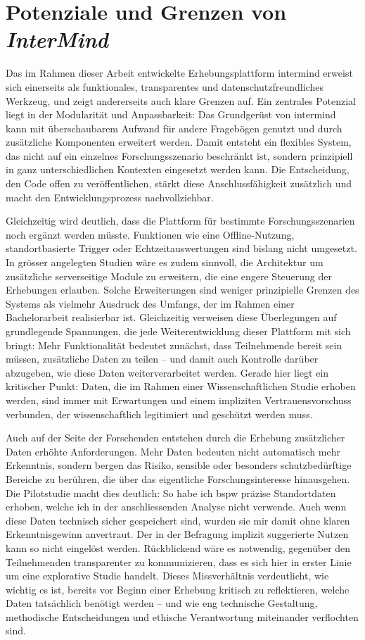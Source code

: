 \section{Potenziale und Grenzen von \textit{InterMind}}

Das im Rahmen dieser Arbeit entwickelte Erhebungsplattform \gls{intermind} erweist sich einerseits als funktionales, transparentes und datenschutzfreundliches Werkzeug, und zeigt andererseits auch klare Grenzen auf. Ein zentrales Potenzial liegt in der Modularität und Anpassbarkeit: Das Grundgerüst von \gls{intermind} kann mit überschaubarem Aufwand für andere Fragebögen genutzt und durch zusätzliche Komponenten erweitert werden. Damit entsteht ein flexibles System, das nicht auf ein einzelnes Forschungsszenario beschränkt ist, sondern prinzipiell in ganz unterschiedlichen Kontexten eingesetzt werden kann. Die Entscheidung, den Code offen zu veröffentlichen, stärkt diese Anschlussfähigkeit zusätzlich und macht den Entwicklungsprozess nachvollziehbar.

Gleichzeitig wird deutlich, dass die Plattform für bestimmte Forschungsszenarien noch ergänzt werden müsste. Funktionen wie eine Offline-Nutzung, standortbasierte Trigger oder Echtzeitauswertungen sind bislang nicht umgesetzt. In grösser angelegten Studien wäre es zudem sinnvoll, die Architektur um zusätzliche serverseitige Module zu erweitern, die eine engere Steuerung der Erhebungen erlauben. Solche Erweiterungen sind weniger prinzipielle Grenzen des Systems als vielmehr Ausdruck des Umfangs, der im Rahmen einer Bachelorarbeit realisierbar ist. Gleichzeitig verweisen diese Überlegungen auf grundlegende Spannungen, die jede Weiterentwicklung dieser Plattform mit sich bringt: Mehr Funktionalität bedeutet zunächst, dass Teilnehmende bereit sein müssen, zusätzliche Daten zu teilen -- und damit auch Kontrolle darüber abzugeben, wie diese Daten weiterverarbeitet werden. Gerade hier liegt ein kritischer Punkt: Daten, die im Rahmen einer Wissenschaftlichen Studie erhoben werden, sind immer mit Erwartungen und einem impliziten Vertrauensvorschuss verbunden, der wissenschaftlich legitimiert und geschützt werden muss.

Auch auf der Seite der Forschenden entstehen durch die Erhebung zusätzlicher Daten erhöhte Anforderungen. Mehr Daten bedeuten nicht automatisch mehr Erkenntnis, sondern bergen das Risiko, sensible oder besonders schutzbedürftige Bereiche zu berühren, die über das eigentliche Forschungsinteresse hinausgehen. Die Pilotstudie macht dies deutlich: So habe ich \gls{bspw} präzise Standortdaten erhoben, welche ich in der anschliessenden Analyse nicht verwende. Auch wenn diese Daten technisch sicher gespeichert sind, wurden sie mir damit ohne klaren Erkenntnisgewinn anvertraut. Der in der Befragung implizit suggerierte Nutzen kann so nicht eingelöst werden. Rückblickend wäre es notwendig, gegenüber den Teilnehmenden transparenter zu kommunizieren, dass es sich hier in erster Linie um eine explorative Studie handelt. Dieses Missverhältnis verdeutlicht, wie wichtig es ist, bereits vor Beginn einer Erhebung kritisch zu reflektieren, welche Daten tatsächlich benötigt werden -- und wie eng technische Gestaltung, methodische Entscheidungen und ethische Verantwortung miteinander verflochten sind.


